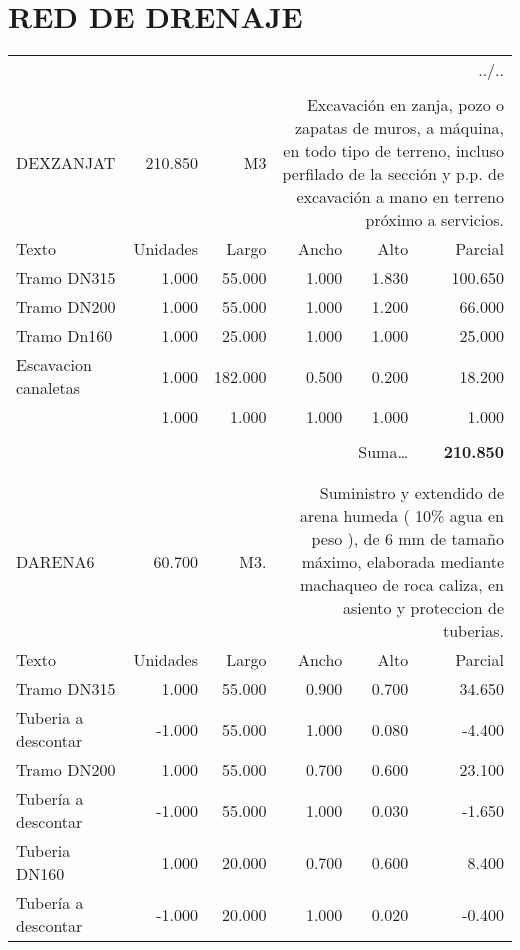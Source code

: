 \documentclass{book}%
\begin{document}
%
\section{RED DE DRENAJE}%
\label{sec:REDDEDRENAJE}%
\begin{longtable}{lrrrrr}%
\multicolumn{6}{r}{../..}\\%
\endfoot%
\endlastfoot%
&&&&&\\%
DEXZANJAT&210.850& M3&\multicolumn{3}{p{6cm}}{\scriptsize Excavación en zanja, pozo o zapatas de muros, a máquina, en todo tipo de terreno, incluso perfilado de la sección y p.p. de excavación a mano en terreno próximo a servicios.\normalsize}\\%
Texto&Unidades&Largo&Ancho&Alto&Parcial\\%
\hline%
\multicolumn{1}{p{3.5cm}}{Tramo DN315}&1.000&55.000&1.000&1.830&100.650\\%
\multicolumn{1}{p{3.5cm}}{Tramo DN200}&1.000&55.000&1.000&1.200&66.000\\%
\multicolumn{1}{p{3.5cm}}{Tramo Dn160}&1.000&25.000&1.000&1.000&25.000\\%
\multicolumn{1}{p{3.5cm}}{Escavacion canaletas }&1.000&182.000&0.500&0.200&18.200\\%
\multicolumn{1}{p{3.5cm}}{}&1.000&1.000&1.000&1.000&1.000\\%
&&&&&\\%
\multicolumn{5}{r}{Suma\ldots}&\textbf{210.850}\\%
\hline%
&&&&&\\%
&&&&&\\%
DARENA6&60.700& M3.&\multicolumn{3}{p{6cm}}{\scriptsize Suministro y extendido de arena humeda ( 10\% agua en peso ), de 6 mm de tamaño máximo, elaborada mediante machaqueo de roca caliza, en asiento y proteccion de tuberias.\normalsize}\\%
Texto&Unidades&Largo&Ancho&Alto&Parcial\\%
\hline%
\multicolumn{1}{p{3.5cm}}{Tramo DN315}&1.000&55.000&0.900&0.700&34.650\\%
\multicolumn{1}{p{3.5cm}}{Tuberia a descontar}&{-}1.000&55.000&1.000&0.080&{-}4.400\\%
\multicolumn{1}{p{3.5cm}}{Tramo DN200}&1.000&55.000&0.700&0.600&23.100\\%
\multicolumn{1}{p{3.5cm}}{Tubería a descontar}&{-}1.000&55.000&1.000&0.030&{-}1.650\\%
\multicolumn{1}{p{3.5cm}}{Tuberia DN160}&1.000&20.000&0.700&0.600&8.400\\%
\multicolumn{1}{p{3.5cm}}{Tubería a descontar}&{-}1.000&20.000&1.000&0.020&{-}0.400\\%

\end{longtable}
\end{document}
